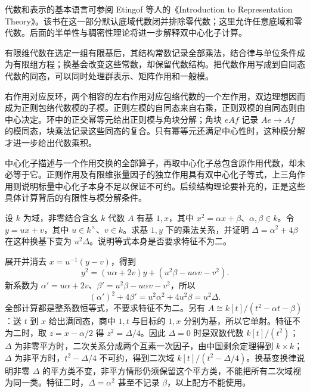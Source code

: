 \ProseParagraphBreak
代数和表示的基本语言可参阅 Etingof 等人的《Introduction to Representation Theory》\cite[\S 2.2, pp. 8--9; \S 2.3, pp. 9--10]{EtingofEtAl2011RepresentationTheory}。该书在这一部分默认底域代数闭并排除零代数；这里允许任意底域和零代数。后面的半单性与稠密性理论将进一步解释双中心化子计算。






\begin{chaptersummary}
	有限维代数在选定一组有限基后，其结构常数记录全部乘法，结合律与单位条件成为有限组方程；换基会改变这些常数，却保留代数结构。把代数作用写成到自同态代数的同态，可以同时处理群表示、矩阵作用和一般模。

	\ProseParagraphBreak
	右作用对应反环，两个相容的左右作用对应包络代数的一个左作用，双边理想因而成为正则包络代数模的子模。正则左模的自同态来自右乘，正则双模的自同态则由中心决定。环中的正交幂等元给出正则模与角块分解；角块 \(eAf\) 记录 \(Ae\to Af\) 的模同态，块乘法记录这些同态的复合。只有幂等元还满足中心性时，这种模分解才进一步给出代数乘积。

	\ProseParagraphBreak
	中心化子描述与一个作用交换的全部算子，再取中心化子总包含原作用代数，却未必等于它。正则作用及有限维张量因子的独立作用具有双中心化子等式，上三角作用则说明标量中心化子本身不足以保证不可约。后续结构理论要补充的，正是这些具体计算背后的有限性与模分解条件。
\end{chaptersummary}

\BookExercises

\begin{exercise}\label{b2:ex:11-two-dimensional-constants}
	设 \(k\) 为域，非零结合含幺 \(k\) 代数 \(A\) 有基 \(1,x\)，其中 \(x^2=\alpha x+\beta\)、\(\alpha,\beta\in k\)。令 \(y=ux+v\)，其中 \(u\in k^\times\)、\(v\in k\)。求基 \(1,y\) 下的乘法关系，并证明 \(\Delta=\alpha^2+4\beta\) 在这种换基下变为 \(u^2\Delta\)。说明等式本身是否要求特征不为二。
\end{exercise}
\begin{solution}
	展开并消去 \(x=u^{-1}(y-v)\)，得到
	\[
		y^2=(u\alpha+2v)y+(u^2\beta-u\alpha v-v^2).
	\]
	新系数为 \(\alpha'=u\alpha+2v\)、\(\beta'=u^2\beta-u\alpha v-v^2\)，所以
	\[
		(\alpha')^2+4\beta'=u^2\alpha^2+4u^2\beta=u^2\Delta.
	\]
	全部计算都是整系数恒等式，不要求特征不为二。另有 \(A\cong k[t]/(t^2-\alpha t-\beta)\)：送 \(t\) 到 \(x\) 给出满同态，商中 \(1,t\) 与目标的 \(1,x\) 分别为基，所以它单射。特征不为二时，取 \(z=x-\alpha/2\) 得 \(z^2=\Delta/4\)。因此 \(\Delta=0\) 时是双数代数 \(k[t]/(t^2)\)；\(\Delta\) 为非零平方时，二次关系分成两个互素一次因子，由中国剩余定理得到 \(k\times k\)；\(\Delta\) 为非平方时，\(t^2-\Delta/4\) 不可约，得到二次域 \(k[t]/(t^2-\Delta/4)\)。换基变换律说明非零 \(\Delta\) 的平方类不变，非平方情形仍须保留这个平方类，不能把所有二次域视为同一类。特征二时，\(\Delta=\alpha^2\) 甚至不记录 \(\beta\)，以上配方不能使用。
\end{solution}

